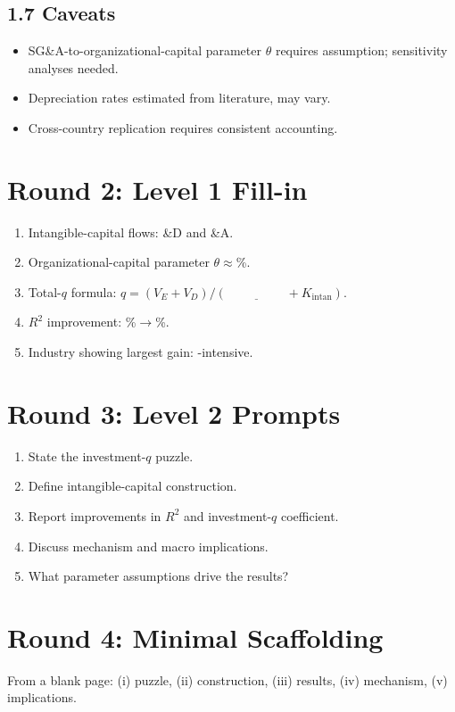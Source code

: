 \documentclass[11pt]{article}
\newcommand{\blank}[1]{\underline{\hspace{#1}}}
\begin{document}
\subsection*{1.7 Caveats}
\begin{alertbox}
\begin{itemize}
\item SG\&A-to-organizational-capital parameter $\theta$ requires assumption; sensitivity analyses needed.
\item Depreciation rates estimated from literature, may vary.
\item Cross-country replication requires consistent accounting.
\end{itemize}
\end{alertbox}

\section*{Round 2: Level 1 Fill-in}
\begin{enumerate}
\item Intangible-capital flows: \blank{1cm}\&D and \blank{1cm}\&A.
\item Organizational-capital parameter $\theta\approx$\blank{1cm}\%.
\item Total-$q$ formula: $q=(V_E+V_D)/(\blank{2cm}+K_\text{intan})$.
\item $R^2$ improvement: \blank{1cm}\%$\to$\blank{1cm}\%.
\item Industry showing largest gain: \blank{2cm}-intensive.
\end{enumerate}

\section*{Round 3: Level 2 Prompts}
\begin{enumerate}
\item State the investment-$q$ puzzle.
\item Define intangible-capital construction.
\item Report improvements in $R^2$ and investment-$q$ coefficient.
\item Discuss mechanism and macro implications.
\item What parameter assumptions drive the results?
\end{enumerate}

\section*{Round 4: Minimal Scaffolding}
From a blank page: (i) puzzle, (ii) construction, (iii) results, (iv) mechanism, (v) implications.
\end{document}
